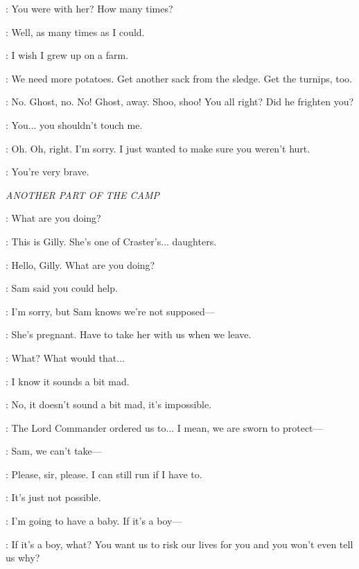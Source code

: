 \SAM: You were with her? How many times?

\GRENN: Well, as many times as I could.

\SAM: I wish I grew up on a farm.

\EDD: We need more potatoes. Get another sack from the sledge. Get the turnips, too.



\SAM: No. Ghost, no. No! Ghost, away. Shoo, shoo! You all right? Did he frighten you?

\GILLY: You$\ldots$ you shouldn't touch me.

\SAM: Oh. Oh, right. I'm sorry. I just wanted to make sure you weren't hurt.

\GILLY: You're very brave.


\scene

\textit{ANOTHER PART OF THE CAMP}


\JON: What are you doing?

\SAM: This is Gilly. She's one of Craster's$\ldots$ daughters.

\JON: Hello, Gilly. What are you doing?

\GILLY: Sam said you could help.

\JON: I'm sorry, but Sam knows we're not supposed---

\SAM: She's pregnant. Have to take her with us when we leave.

\JON: What? What would that$\ldots$

\SAM: I know it sounds a bit mad.

\JON: No, it doesn't sound a bit mad, it's impossible.

\SAM: The Lord Commander ordered us to$\ldots$ I mean, we are sworn to protect---

\JON: Sam, we can't take---

\GILLY: Please, sir, please. I can still run if I have to.

\JON: It's just not possible.

\GILLY: I'm going to have a baby. If it's a boy---

\JON: If it's a boy, what? You want us to risk our lives for you and you won't even tell us why?


